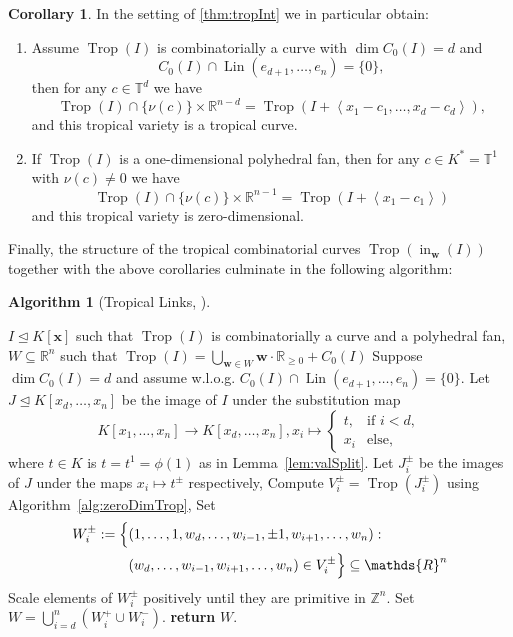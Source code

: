 \documentclass[
  paper=a4,
  titlepage,
  bibliography=totoc,
  pagesize=pdftex
]{scrartcl}
\numberwithin{figure}{section}
\numberwithin{equation}{section}
\numberwithin{table}{section}
\newcommand*\setZ{\mathds{Z}}
\newcommand*\setR{\mathds{R}}
\newcommand*\setT{\mathds{T}}
\newcommand*\ideal[1]{\left\langle #1 \right\rangle}
\let\vec\mathbf
\let\idealof\trianglelefteq
\DeclareMathOperator{\Trop}{Trop}
\DeclareMathOperator{\initial}{in}
\DeclareMathOperator{\Lin}{Lin}
\theoremstyle{definition}
\newtheorem{algo}[definition]{Algorithm}
\newtheorem{corollary}[definition]{Corollary}
\numberwithin{definition}{section}
\begin{document}
\begin{corollary} \label{cor:tropInt}
  In the setting of \ref{thm:tropInt} we in particular obtain:
  \begin{enumerate}
    \item Assume $\Trop(I)$ is combinatorially a curve with $\dim C_0(I) = d$ and
      \[
        C_0(I)\cap \Lin(e_{d+1}, \dots, e_n) = \{0\},
      \]
      then for any $c \in \setT^d$ we have
      \[
        \Trop(I) \cap \{\nu(c)\} \times \setR^{n-d} = \Trop(I + \ideal{x_1-c_1, \dots,
        x_d-c_d}),
      \]
      and this tropical variety is a tropical curve.
      \label{cor:i}
    \item If $\Trop(I)$ is a one-dimensional polyhedral fan, then for any $c \in K^* =
      \setT^1$ with $\nu(c)\neq0$ we have
      \[
        \Trop(I) \cap \{\nu(c)\} \times \setR^{n-1} = \Trop(I + \ideal{x_1-c_1})
      \]
      and this tropical variety is zero-dimensional.
      \label{cor:ii}
  \end{enumerate}
\end{corollary}

Finally, the structure of the tropical combinatorial curves $\Trop(\initial_{\vec w}(I))$ together
with the above corollaries culminate in the following algorithm:

\begin{algo}[Tropical Links, {\cite[Algorithm~4.5]{tropPointsLinks}}]\
  \label{alg:tropLinks}
  \begin{algorithmic}[1]
    \Require $I \idealof K[\vec x]$ such that $\Trop(I)$ is combinatorially a curve and a
    polyhedral fan,
    \Ensure $W \subseteq \setR^n$ such that $\Trop(I) = \bigcup_{\vec w \in W} \vec w
      \cdot \setR_{\geq0} + C_0(I)$
    \State Suppose $\dim C_0(I) = d$ and assume w.l.o.g. $C_0(I) \cap \Lin(e_{d+1}, \dots,
      e_n) = \{0\}$.
    \State Let $J \idealof K[x_d, \dots, x_n]$ be the image of $I$ under the substitution
      map
      \[
        K[x_1, \dots, x_n] \to K[x_d, \dots, x_n], x_i \mapsto
        \begin{cases}
          t, & \text{if } i < d, \\
          x_i & \text{else},
        \end{cases}
      \]
      where $t \in K$ is $t = t^1 = \phi(1)$ as in Lemma~\ref{lem:valSplit}.
      \label{alg:links:cut}
      \State Let $J_i^\pm$ be the images of $J$ under the maps $x_i \mapsto t^\pm$
        respectively,
        \label{alg:links:curve}
      \State Compute $V_i^\pm = \Trop(J_i^\pm)$ using Algorithm~\ref{alg:zeroDimTrop},
      \State Set
        \begin{align*}
          W_i^\pm := \Bigl\{
            &(1, \dots, 1, w_d, \dots, w_{i-1}, \pm1, w_{i+1}, \dots, w_n) : \\
            &(w_d, \dots, w_{i-1}, w_{i+1}, \dots, w_n) \in V_i^\pm
          \Bigr\} \subseteq \setR^n
        \end{align*}
      \State Scale elements of $W_i^\pm$ positively until they are primitive in $\setZ^n$.
    \EndFor
    \State Set $W = \bigcup_{i=d}^n (W_i^+ \cup W_i^-)$.
    \State\textbf{return} $W$.
  \end{algorithmic}
\end{algo}
\end{document}
